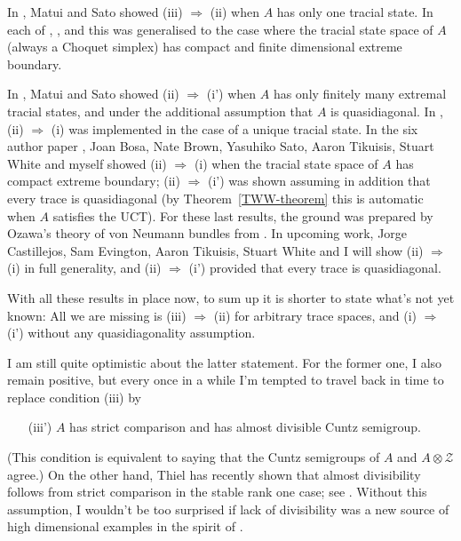 \documentclass{amsart}
\newcounter{number}[section]
\newenvironment{nummer}{\refstepcounter{number}{\noindent\arabic{section}.\arabic{number}}}{}
\newcommand{\bn}{\noindent \begin{nummer} \rm}
\newcommand{\en}{\end{nummer}}
\begin{document}
In \cite{MS:Acta}, Matui and Sato showed (iii) $\Longrightarrow$ (ii) when $A$ has only one tracial state.  In each of \cite{S:Preprint2}, \cite{KR:Crelle}, and \cite{TWW:IMRN} this was generalised to the case where the tracial state space of $A$ (always a Choquet simplex) has compact and finite dimensional extreme boundary. 

In \cite{MS:DMJ}, Matui and Sato showed (ii) $\Longrightarrow$ (i') when $A$ has only finitely many extremal tracial states, and under the additional assumption that $A$ is quasidiagonal. In \cite{SWW:Invent}, (ii) $\Longrightarrow$ (i) was implemented in the case of a unique tracial state. In the six author paper \cite{BBSTWW:arXiv}, Joan Bosa, Nate Brown, Yasuhiko Sato, Aaron Tikuisis, Stuart White and myself showed (ii) $\Longrightarrow$ (i) when the tracial state space of $A$ has compact extreme boundary; (ii) $\Longrightarrow$ (i') was shown assuming in addition that every trace is quasidiagonal (by Theorem~\ref{TWW-theorem} this is automatic when $A$ satisfies the UCT). For these last results, the ground was prepared by Ozawa's theory of von Neumann bundles from \cite{O:JMSUT}. In upcoming work, Jorge Castillejos, Sam Evington, Aaron Tikuisis, Stuart White and I will show (ii) $\Longrightarrow$ (i) in full generality, and (ii) $\Longrightarrow$ (i') provided that every trace is quasidiagonal.  
\en

\bn
With all these results in place now, to sum up it is shorter to state what's not yet known: All we are missing is (iii) $\Longrightarrow$ (ii) for arbitrary trace spaces, and (i) $\Longrightarrow$ (i') without any quasidiagonality assumption. 

I am still quite optimistic about the latter statement. For the former one, I also remain positive, but every once in a while I'm tempted to travel back in time to replace condition (iii) by
\begin{itemize}
\item[(iii')] $A$ has strict comparison and has almost divisible Cuntz semigroup.
\end{itemize}
(This condition is equivalent to saying that the Cuntz semigroups of $A$ and $A \otimes \mathcal{Z}$ agree.) On the other hand, Thiel has recently shown that almost divisibility follows from strict comparison in the stable rank one case; see \cite{Thi:ranks}. Without this assumption, I wouldn't be too surprised if lack of divisibility was a new source of high dimensional examples in the spirit of \cite{T:Ann}.
\en
\end{document}
